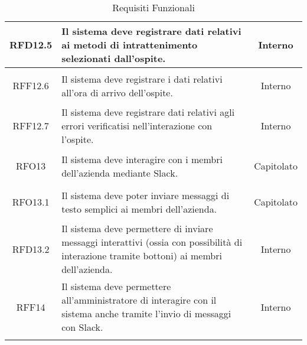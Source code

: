 \begin{longtable}{|c|>{\centering}m{7cm}|c|}
	\hypertarget{RFD12.5}{RFD12.5} & Il sistema deve registrare dati relativi ai metodi di intrattenimento selezionati dall'ospite. & Interno\\ \hline
	\hypertarget{RFF12.6}{RFF12.6} & Il sistema deve registrare i dati relativi all'ora di arrivo dell'ospite. & Interno\\ \hline
	\hypertarget{RFF12.7}{RFF12.7} & Il sistema deve registrare dati relativi agli errori verificatisi nell'interazione con l'ospite. & Interno\\ \hline
	\hypertarget{RFO13}{RFO13} & Il sistema deve interagire con i membri dell'azienda mediante Slack. & Capitolato\\ \hline
	\hypertarget{RFO13.1}{RFO13.1} & Il sistema deve poter inviare messaggi di testo semplici ai membri dell'azienda. & Capitolato\\ \hline
	\hypertarget{RFD13.2}{RFD13.2} & Il sistema deve permettere di inviare messaggi interattivi (ossia con possibilità di interazione tramite bottoni) ai membri dell'azienda. & Interno\\ \hline
	\hypertarget{RFF14}{RFF14} & Il sistema deve permettere all'amministratore di interagire con il sistema anche tramite l'invio di messaggi con Slack. & Interno\\ \hline
	
	\caption[Requisiti Funzionali]{Requisiti Funzionali}
	\label{tabella:req0}
\end{longtable}
\clearpage
